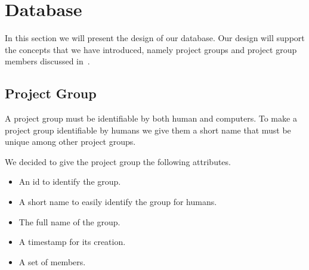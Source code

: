 \section{Database}
In this section we will present the design of our database.
Our design will support the concepts that we have introduced, namely project groups and project group members discussed in~.

\subsection{Project Group}
A project group must be identifiable by both human and computers.
To make a project group identifiable by humans we give them a short name that must be unique among other project groups.


We decided to give the project group the following attributes. 
\begin{itemize}
	\item An id to identify the group. 
	\item A short name to easily identify the group for humans. 
	\item The full name of the group. 
	\item A timestamp for its creation. 
	\item A set of members. 
\end{itemize}

